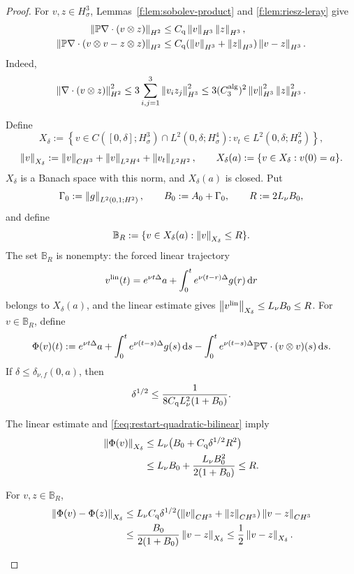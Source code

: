 \begin{proof}
For \(v,z\in H^3_\sigma\), Lemmas~\ref{f:lem:sobolev-product} and
\ref{f:lem:riesz-leray} give
\begin{align}
 \left\lVert \mathbb P\nabla\cdot(v\otimes z)\right\rVert_{H^2}
 &\le C_{\rm q}\left\lVert v\right\rVert_{H^3}\left\lVert z\right\rVert_{H^3},
 \label{f:eq:restart-quadratic-bilinear}\\
 \left\lVert \mathbb P\nabla\cdot(v\otimes v-z\otimes z)\right\rVert_{H^2}
 &\le C_{\rm q}(\left\lVert v\right\rVert_{H^3}+\left\lVert z\right\rVert_{H^3})
 \left\lVert v-z\right\rVert_{H^3}.
 \label{f:eq:restart-quadratic-difference}
\end{align}
Indeed,
\[
 \left\lVert \nabla\cdot(v\otimes z)\right\rVert_{H^2}^2
 \le3\sum_{i,j=1}^3\left\lVert v_i z_j\right\rVert_{H^3}^2
 \le3(C_3^{\rm alg})^2\left\lVert v\right\rVert_{H^3}^2\left\lVert z\right\rVert_{H^3}^2.
\]

Define
\[
 X_\delta:=
 \left\{v\in C([0,\delta];H^3_\sigma)\cap L^2(0,\delta;H^4_\sigma):
 v_t\in L^2(0,\delta;H^2_\sigma)\right\},
\]
\[
 \left\lVert v\right\rVert_{X_\delta}:=\left\lVert v\right\rVert_{C H^3}
 +\left\lVert v\right\rVert_{L^2H^4}+\left\lVert v_t\right\rVert_{L^2H^2},
 \qquad
 X_\delta(a):=\{v\in X_\delta:v(0)=a\}.
\]
\(X_\delta\) is a Banach space with this norm, and \(X_\delta(a)\) is closed.
Put
\[
 \Gamma_0:=\left\lVert g\right\rVert_{L^2(0,1;H^2)},
 \qquad B_0:=A_0+\Gamma_0,
 \qquad R:=2L_\nu B_0,
\]
and define
\[
 \mathbb B_R:=\{v\in X_\delta(a):\left\lVert v\right\rVert_{X_\delta}\le R\}.
\]
The set \(\mathbb B_R\) is nonempty: the forced linear trajectory
\[
 v^{\rm lin}(t)=e^{\nu t\Delta}a
 +\int_0^te^{\nu(t-r)\Delta}g(r)\,\mathrm d r
\]
belongs to \(X_\delta(a)\), and the linear estimate gives
\(\left\lVert v^{\rm lin}\right\rVert_{X_\delta}\le L_\nu B_0\le R\).
For \(v\in\mathbb B_R\), define
\[
 \Phi(v)(t):=e^{\nu t\Delta}a
 +\int_0^te^{\nu(t-s)\Delta}g(s)\,\mathrm d s
 -\int_0^te^{\nu(t-s)\Delta}
 \mathbb P\nabla\cdot(v\otimes v)(s)\,\mathrm d s.
\]
If \(\delta\le\delta_{\nu,f}(0,a)\), then
\[
 \delta^{1/2}\le
 \frac{1}{8C_{\rm q}L_\nu^2(1+B_0)}.
\]
\begin{samepage}
The linear estimate and \eqref{f:eq:restart-quadratic-bilinear} imply
\begin{align*}
 \left\lVert \Phi(v)\right\rVert_{X_\delta}
 &\le L_\nu\bigl(B_0+C_{\rm q}\delta^{1/2}R^2\bigr)\\
 &\le L_\nu B_0+\frac{L_\nu B_0^2}{2(1+B_0)}
 \le R.
\end{align*}
\end{samepage}
\begin{samepage}
For \(v,z\in\mathbb B_R\),
\begin{align*}
 \norm{\Phi(v)-\Phi(z)}_{X_\delta}
 &\le L_\nu C_{\rm q}\delta^{1/2}
 (\norm v_{C H^3}+\norm z_{C H^3})
 \norm{v-z}_{C H^3}\\
 &\le\frac{B_0}{2(1+B_0)}\norm{v-z}_{X_\delta}
 \le\frac12\norm{v-z}_{X_\delta}.

\end{align*}
\end{samepage}
\end{proof}
